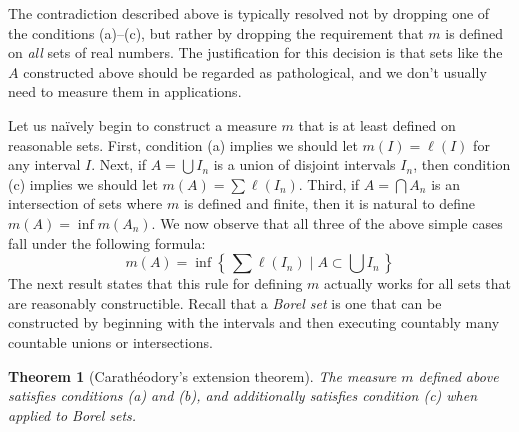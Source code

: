 \documentclass[11pt,oneside]{amsbook}
\newcommand{\set}[1]{\left\{\,#1\,\right\}}
\theoremstyle{definition}
\theoremstyle{plain}
\newtheorem{thm}{Theorem}[section]
\theoremstyle{definition}
\theoremstyle{remark}
\begin{document}
The contradiction described above is typically resolved not by dropping one of the conditions (a)--(c), but rather by dropping the requirement that $m$ is defined on \emph{all} sets of real numbers. The justification for this decision is that sets like the $A$ constructed above should be regarded as pathological, and we don't usually need to measure them in applications.

Let us na\"ively begin to construct a measure $m$ that is at least defined on reasonable sets. First, condition (a) implies we should let $m(I)=\ell(I)$ for any interval $I$. Next, if $A=\bigcup I_n$ is a union of disjoint intervals $I_n$, then condition (c) implies we should let $m(A)=\sum\ell(I_n)$. Third, if $A=\bigcap A_n$ is an intersection of sets where $m$ is defined and finite, then it is natural to define $m(A)=\inf m(A_n)$. We now observe that all three of the above simple cases fall under the following formula:
\[m(A)=\inf\set{\sum\ell(I_n)\mid A\subset\bigcup I_n}
\]
The next result states that this rule for defining $m$ actually works for all sets that are reasonably constructible. Recall that a \emph{Borel set} is one that can be constructed by beginning with the intervals and then executing countably many countable unions or intersections.

\begin{thm}[Carath\'eodory's extension theorem]
  \label{thm:caratheodory}
  The measure $m$ defined above satisfies conditions (a) and (b), and additionally satisfies condition (c) when applied to Borel sets.
\end{thm}
\end{document}
